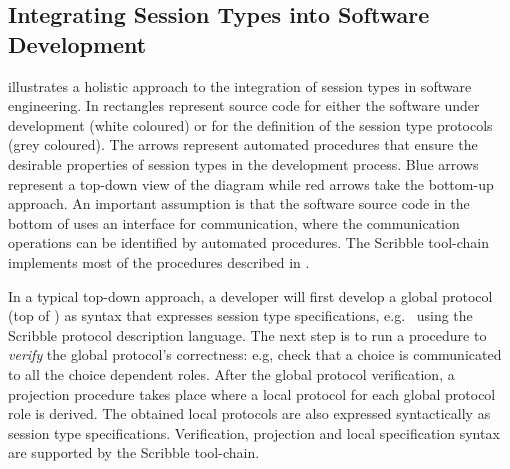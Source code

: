 \subsection{Integrating Session Types into Software Development}%
\label{sec:sessions_integrate}

 illustrates a holistic approach to the integration of session
types in software engineering.
In  rectangles
represent source code for either the software
under development (white coloured) or for the definition
of the session type protocols (grey coloured).
The arrows
represent automated procedures that ensure
the desirable properties of session types
in the development process. Blue arrows represent
a top-down view of the diagram while red arrows take
the bottom-up approach.
An important assumption
is that the software source code in the
bottom of  uses an interface
for communication, where the communication
operations can be identified by automated
procedures.
%
The Scribble tool-chain implements
most of the procedures described in .







In a typical top-down approach, a developer will first develop
a global protocol (top of )
as syntax that expresses session type specifications,
e.g.\ 
using the Scribble protocol description language.
The next step is to run a procedure to {\em verify} the
global protocol's correctness: e.g, check that a choice
is communicated to all the choice dependent roles.
After the global protocol verification, a projection
procedure takes place where a local protocol
for each global protocol role is derived.
The obtained local protocols are also expressed
syntactically as session type specifications.
Verification, projection and local specification
syntax are supported by the Scribble tool-chain.

